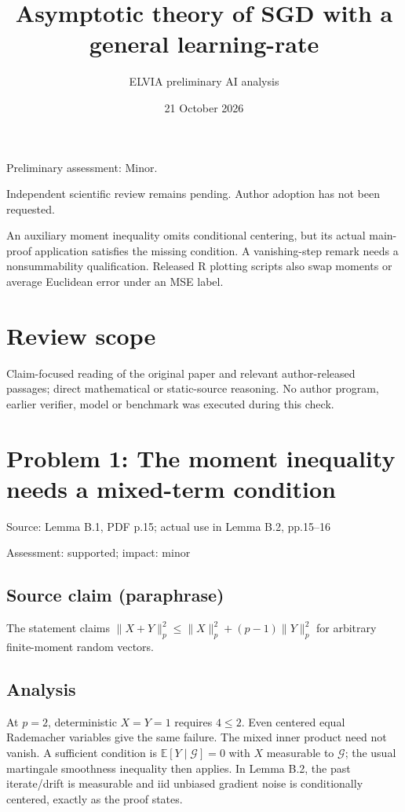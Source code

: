 \documentclass[11pt]{article}
\begin{document}
\title{Asymptotic theory of SGD with a general learning-rate}

\author{ELVIA preliminary AI analysis}\date{21 October 2026}\maketitle

Preliminary assessment: Minor.\par

Independent scientific review remains pending. Author adoption has not been requested.

An auxiliary moment inequality omits conditional centering, but its actual main-proof application satisfies the missing condition. A vanishing-step remark needs a nonsummability qualification. Released R plotting scripts also swap moments or average Euclidean error under an MSE label.

\section*{Review scope}

Claim-focused reading of the original paper and relevant author-released passages; direct mathematical or static-source reasoning. No author program, earlier verifier, model or benchmark was executed during this check.

\section*{Problem 1: The moment inequality needs a mixed-term condition}

Source: Lemma B.1, PDF p.15; actual use in Lemma B.2, pp.15–16

Assessment: supported; impact: minor

\subsection*{Source claim (paraphrase)}

The statement claims \(\|X+Y\|_p^2\le\|X\|_p^2+(p-1)\|Y\|_p^2\) for arbitrary finite-moment random vectors.

\subsection*{Analysis}

At \(p=2\), deterministic \(X=Y=1\) requires \(4\le2\). Even centered equal Rademacher variables give the same failure. The mixed inner product need not vanish. A sufficient condition is \(\mathbb E[Y\mid\mathcal G]=0\) with \(X\) measurable to \(\mathcal G\); the usual martingale smoothness inequality then applies. In Lemma B.2, the past iterate/drift is measurable and iid unbiased gradient noise is conditionally centered, exactly as the proof states.
\end{document}
